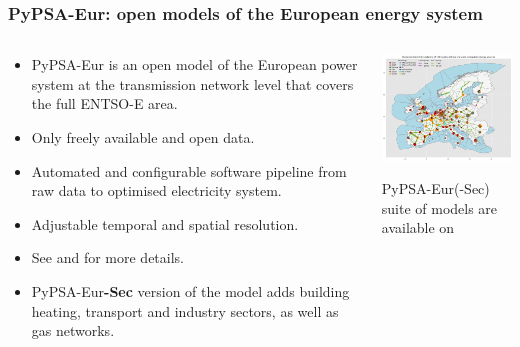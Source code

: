 \begin{frame}
  \frametitle{PyPSA-Eur: open models of the European energy system}

  \begin{columns}[T]
  \begin{column}{7cm}
  {\small
  \begin{itemize}
  \item PyPSA-Eur is an open model of the European power system at the transmission network 
  level that covers the full ENTSO-E area.
  \item Only freely available and open data.
  \item Automated and configurable software pipeline from raw data to optimised electricity system.
  \item Adjustable temporal and spatial resolution.
  \item See 
  and  
  for more details.
  \item PyPSA-Eur{\bf-Sec} version of the model adds building heating, transport and industry sectors, as well as gas networks.
  \end{itemize}
  }
  \end{column}

  \begin{column}{9cm}
    \centering
  {\footnotesize
    \includegraphics[width=8cm]{images/elec_s_100.png}
  
   \vspace{0.1cm}
   PyPSA-Eur(-Sec) suite of models are available on 
  }
  \end{column}
  
  \end{columns}

\end{frame}



